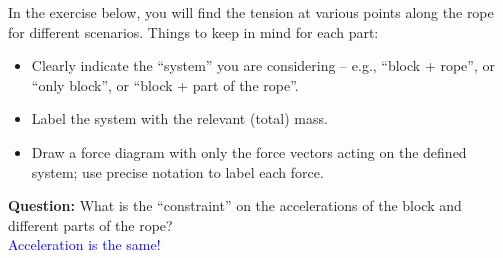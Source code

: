 \documentclass[11pt, letterpaper, openany]{book}
\begin{document}
\begin{center}
\end{center}

In the exercise below, you will find the tension at various points along the rope for different scenarios. Things to keep in mind for each part:
\begin{itemize}
    \item Clearly indicate the ``system'' you are considering -- e.g., ``block + rope'', or ``only block'', or ``block + part of the rope''.
    \item Label the system with the relevant (total) mass.
    \item Draw a force diagram with only the force vectors acting on the defined system; use precise notation to label each force.
\end{itemize}

\textbf{Question:} What is the ``constraint'' on the accelerations of the block and different parts of the rope? \\
\textcolor{blue}{Acceleration is the same!}
\end{document}
